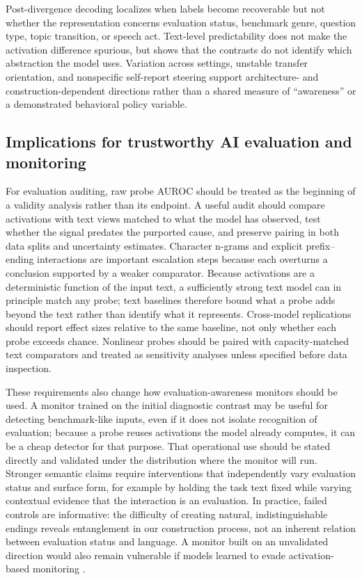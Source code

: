 \documentclass{article}
\begin{document}
Post-divergence decoding localizes when labels become recoverable but not whether
the representation concerns evaluation status, benchmark genre, question type,
topic transition, or speech act. Text-level predictability does not make the
activation difference spurious, but shows that the contrasts do not identify
which abstraction the model uses. Variation across settings, unstable transfer
orientation, and nonspecific self-report steering support architecture- and
construction-dependent directions rather than a shared measure of ``awareness''
or a demonstrated behavioral policy variable.

\subsection{Implications for trustworthy AI evaluation and monitoring}

For evaluation auditing, raw probe AUROC should be treated as the beginning of
a validity analysis rather than its endpoint. A useful audit should compare
activations with text views matched to what the model has observed, test whether
the signal predates the purported cause, and preserve pairing in both data
splits and uncertainty estimates. Character n-grams and explicit
prefix--ending interactions are important escalation steps because each
overturns a conclusion supported by a weaker comparator. Because activations
are a deterministic function of the input text, a sufficiently strong text model
can in principle match any probe; text baselines therefore bound what a probe
adds beyond the text rather than identify what it represents. Cross-model
replications should report effect sizes relative to the same baseline, not only
whether each probe exceeds chance. Nonlinear probes should be paired with
capacity-matched text comparators and treated as sensitivity analyses unless
specified before data inspection.

These requirements also change how evaluation-awareness monitors should be
used. A monitor trained on the initial diagnostic contrast may be useful for
detecting benchmark-like inputs, even if it does not isolate recognition of
evaluation; because a probe reuses activations the model already computes, it
can be a cheap detector for that purpose. That operational use should be stated
directly and validated under the distribution where the monitor will run.
Stronger semantic claims require interventions that independently vary
evaluation status and surface form, for example by holding the task text fixed
while varying contextual evidence that the interaction is an evaluation. In
practice, failed controls are informative: the difficulty of creating natural,
indistinguishable endings reveals entanglement in our construction process, not
an inherent relation between evaluation status and language. A monitor built on an
unvalidated direction would also remain vulnerable if models learned to evade
activation-based monitoring \citep{mcguinness2025chameleons}.
\end{document}

